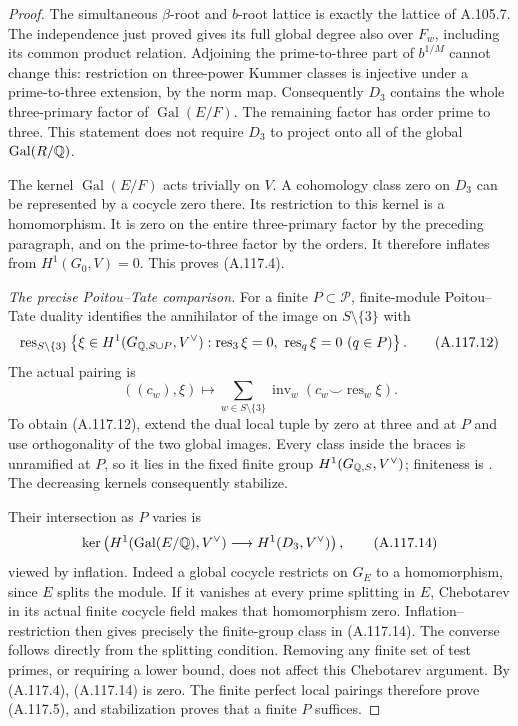 \begin{proof}
The simultaneous \(\beta\)-root and \(b\)-root lattice
is exactly the lattice of A.105.7.
The independence just proved gives its full global
degree also over \(F_w\), including its common product
relation.  Adjoining the prime-to-three part of
\(b^{1/M}\) cannot change this: restriction on
three-power Kummer classes is injective under a
prime-to-three extension, by the norm map.
Consequently \(D_3\) contains the whole three-primary
factor of \(\operatorname{Gal}(E/F)\).
The remaining factor has order prime to three.
This statement does not require \(D_3\) to project
onto all of the global \(\operatorname{Gal}(R/\mathbb Q)\).

The kernel \(\operatorname{Gal}(E/F)\) acts trivially
on \(V\).  A cohomology class zero on \(D_3\) can
be represented by a cocycle zero there.
Its restriction to this kernel is a homomorphism.
It is zero on the entire three-primary factor by
the preceding paragraph, and on the prime-to-three
factor by the orders.  It therefore inflates from
\(H^1(G_0,V)=0\).  This proves (A.117.4).

\emph{The precise Poitou--Tate comparison.}
For a finite \(P\subset\mathcal P\), finite-module
Poitou--Tate duality
\cite[I, Theorem 4.10(b)]{BIR_MilneADT}
identifies the annihilator of the image on
\(S\setminus\{3\}\) with
\[
 \operatorname{res}_{S\setminus\{3\}}
 \left\{\xi\in H^1(G_{\mathbb Q,S\cup P},V^\vee):
       \operatorname{res}_3\xi=0,\
       \operatorname{res}_q\xi=0\ (q\in P)\right\}.
 \tag{A.117.12}
\]
The actual pairing is
\[
 ((c_w),\xi)\longmapsto
       \sum_{w\in S\setminus\{3\}}
           \operatorname{inv}_w(c_w\smile\operatorname{res}_w\xi).
 \tag{A.117.13}
\]
To obtain (A.117.12), extend the dual local tuple
by zero at three and at \(P\) and use orthogonality
of the two global images.
Every class inside the braces is unramified at \(P\),
so it lies in the fixed finite group
\(H^1(G_{\mathbb Q,S},V^\vee)\);
finiteness is
\cite[I, Corollary 4.15]{BIR_MilneADT}.
The decreasing kernels consequently stabilize.

Their intersection as \(P\) varies is
\[
 \ker\left(
 H^1(\operatorname{Gal}(E/\mathbb Q),V^\vee)
          \longrightarrow H^1(D_3,V^\vee)\right),
 \tag{A.117.14}
\]
viewed by inflation.
Indeed a global cocycle restricts on \(G_E\) to
a homomorphism, since \(E\) splits the module.
If it vanishes at every prime splitting in \(E\),
Chebotarev in its actual finite cocycle field makes
that homomorphism zero.  Inflation--restriction
then gives precisely the finite-group class in
(A.117.14).  The converse follows directly from
the splitting condition.  Removing any finite
set of test primes, or requiring a lower bound,
does not affect this Chebotarev argument.
By (A.117.4), (A.117.14) is zero.
The finite perfect local pairings therefore prove
(A.117.5), and stabilization proves that a finite
\(P\) suffices.


\end{proof}
